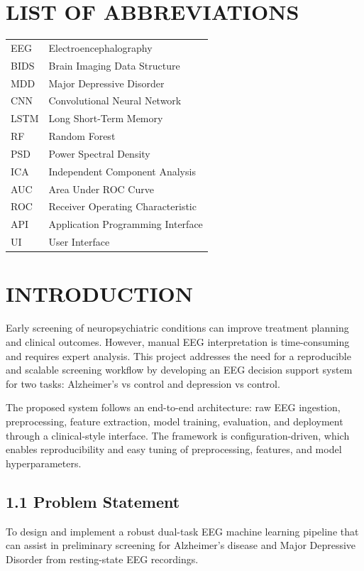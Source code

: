 \documentclass[12pt,a4paper]{report}
\begin{document}
\chapter*{LIST OF ABBREVIATIONS}
\begin{tabular}{ll}
EEG & Electroencephalography \\
BIDS & Brain Imaging Data Structure \\
MDD & Major Depressive Disorder \\
CNN & Convolutional Neural Network \\
LSTM & Long Short-Term Memory \\
RF & Random Forest \\
PSD & Power Spectral Density \\
ICA & Independent Component Analysis \\
AUC & Area Under ROC Curve \\
ROC & Receiver Operating Characteristic \\
API & Application Programming Interface \\
UI & User Interface \\
\end{tabular}
\clearpage

\fancyhf{}
\fancyfoot[R]{\thepage}
\pagestyle{fancy}
\singlespacing

\chapter{INTRODUCTION}
\justifying
Early screening of neuropsychiatric conditions can improve treatment planning and clinical outcomes. However, manual EEG interpretation is time-consuming and requires expert analysis. This project addresses the need for a reproducible and scalable screening workflow by developing an EEG decision support system for two tasks: Alzheimer's vs control and depression vs control.

The proposed system follows an end-to-end architecture: raw EEG ingestion, preprocessing, feature extraction, model training, evaluation, and deployment through a clinical-style interface. The framework is configuration-driven, which enables reproducibility and easy tuning of preprocessing, features, and model hyperparameters.

\section*{1.1 Problem Statement}
\justifying
To design and implement a robust dual-task EEG machine learning pipeline that can assist in preliminary screening for Alzheimer's disease and Major Depressive Disorder from resting-state EEG recordings.
\end{document}
